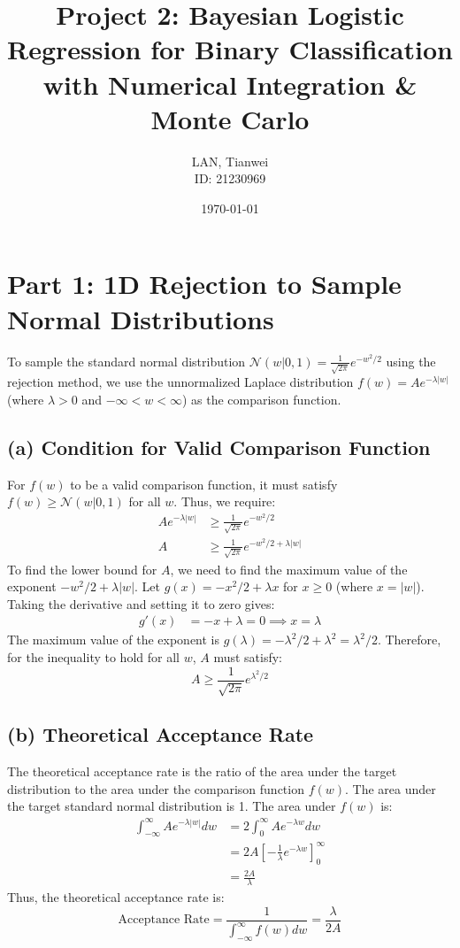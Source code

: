 \documentclass[11pt]{article}
\title{\textbf{Project 2: Bayesian Logistic Regression for Binary Classification with Numerical Integration \& Monte Carlo}}
\author{LAN, Tianwei \\ ID: 21230969}
\date{\today}
\begin{document}
\maketitle

\section{Part 1: 1D Rejection to Sample Normal Distributions}

To sample the standard normal distribution $\mathcal{N}(w|0, 1) = \frac{1}{\sqrt{2\pi}} e^{-w^2/2}$ using the rejection method, we use the unnormalized Laplace distribution $f(w) = A e^{-\lambda|w|}$ (where $\lambda > 0$ and $-\infty < w < \infty$) as the comparison function.

\subsection{(a) Condition for Valid Comparison Function}

For $f(w)$ to be a valid comparison function, it must satisfy $f(w) \ge \mathcal{N}(w|0, 1)$ for all $w$. Thus, we require:
\begin{align*}
A e^{-\lambda|w|} &\ge \frac{1}{\sqrt{2\pi}} e^{-w^2/2} \\
A &\ge \frac{1}{\sqrt{2\pi}} e^{-w^2/2 + \lambda|w|}
\end{align*}
To find the lower bound for $A$, we need to find the maximum value of the exponent $-w^2/2 + \lambda|w|$. Let $g(x) = -x^2/2 + \lambda x$ for $x \ge 0$ (where $x = |w|$). Taking the derivative and setting it to zero gives:
\begin{align*}
g'(x) &= -x + \lambda = 0 \implies x = \lambda
\end{align*}
The maximum value of the exponent is $g(\lambda) = -\lambda^2/2 + \lambda^2 = \lambda^2/2$. 
Therefore, for the inequality to hold for all $w$, $A$ must satisfy:
\begin{equation}
A \ge \frac{1}{\sqrt{2\pi}} e^{\lambda^2/2}
\end{equation}

\subsection{(b) Theoretical Acceptance Rate}

The theoretical acceptance rate is the ratio of the area under the target distribution to the area under the comparison function $f(w)$. The area under the target standard normal distribution is 1. The area under $f(w)$ is:
\begin{align*}
\int_{-\infty}^{\infty} A e^{-\lambda|w|} dw &= 2 \int_{0}^{\infty} A e^{-\lambda w} dw \\
&= 2A \left[ -\frac{1}{\lambda} e^{-\lambda w} \right]_0^\infty \\
&= \frac{2A}{\lambda}
\end{align*}
Thus, the theoretical acceptance rate is:
\begin{equation}
\text{Acceptance Rate} = \frac{1}{\int_{-\infty}^{\infty} f(w) dw} = \frac{\lambda}{2A}
\end{equation}
\end{document}
